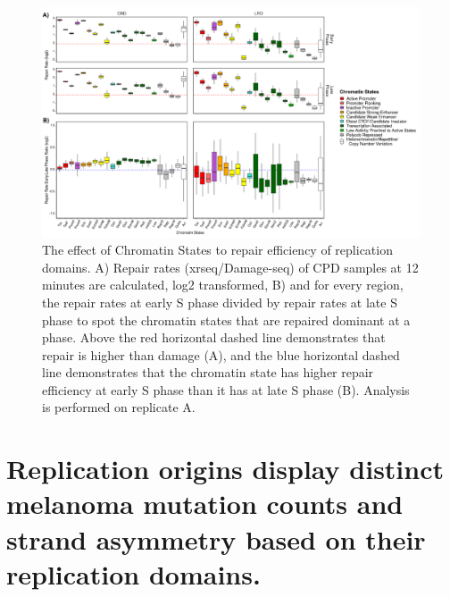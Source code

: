\begin{figure}[H]
    \begin{center}
    \includegraphics[width=\textwidth]{Chapters/4_results/figures/fig3}
    \caption[The effect of Chromatin States to repair efficiency of replication domains.]{The effect of Chromatin States to repair efficiency of replication domains. A) Repair rates (\gls{xrseq}/Damage-seq) of \gls{CPD} samples at 12 minutes are calculated, log2 transformed, B) and for every region, the repair rates at early S phase divided by repair rates at late S phase to spot the chromatin states that are repaired dominant at a phase. Above the red horizontal dashed line demonstrates that repair is higher than damage (A), and the blue horizontal dashed line demonstrates that the chromatin state has higher repair efficiency at early S phase than it has at late S phase (B). Analysis is performed on replicate A.}
    \label{fig:chromatin}
    \end{center}
    \end{figure}

\section{Replication origins display distinct melanoma mutation counts and strand asymmetry based on their replication domains.}

